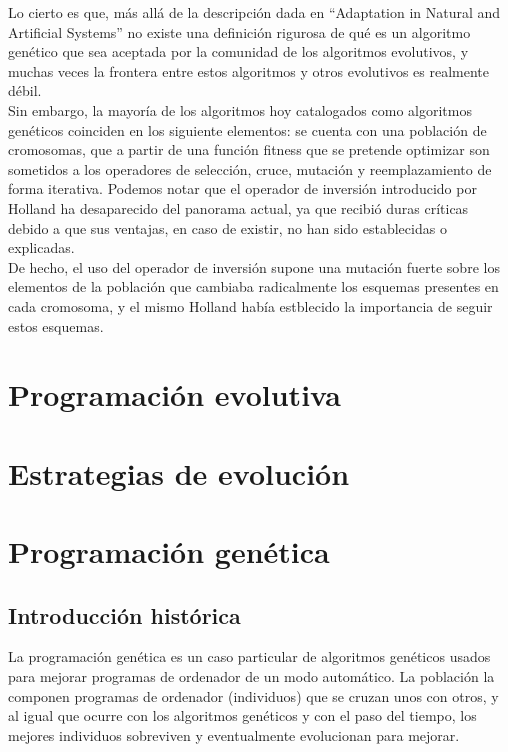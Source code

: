 \documentclass[12pt]{article} \usepackage[utf8x]{inputenc}
\begin{document}
Lo cierto es que, más allá de la descripción dada en ``Adaptation in Natural and Artificial Systems''
no existe una definición rigurosa de qué es un algoritmo genético que sea aceptada por la comunidad de los 
algoritmos evolutivos, y muchas veces la frontera entre estos algoritmos y otros evolutivos es
realmente débil. \\

Sin embargo, la mayoría de los algoritmos hoy catalogados como algoritmos genéticos coinciden en los 
siguiente elementos: se cuenta con una población de cromosomas, que a partir de una función fitness
que se pretende optimizar son sometidos a los operadores de selección, cruce, mutación y reemplazamiento
de forma iterativa. Podemos notar que el operador de inversión introducido por Holland ha desaparecido 
del panorama actual, ya que recibió duras críticas debido a que sus ventajas, en caso de existir, no han 
sido establecidas o explicadas.\\

De hecho, el uso del operador de inversión supone una mutación fuerte sobre los elementos de la población
que cambiaba radicalmente los esquemas presentes en cada cromosoma, y el mismo Holland había estblecido
la importancia de seguir estos esquemas.\\


\section{Programación evolutiva}

\section{Estrategias de evolución}

\section{Programación genética}


\subsection{Introducción histórica} 

La programación genética es un caso particular de algoritmos genéticos usados para mejorar programas de ordenador de un modo automático. La población la componen programas de  ordenador (individuos) que se cruzan unos con otros, y al igual que ocurre con los algoritmos genéticos y con el paso del tiempo, los mejores individuos sobreviven y eventualmente evolucionan para mejorar. \\
\end{document}

